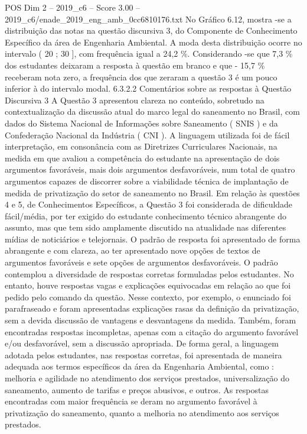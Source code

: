 \begin{textsample}{POS Dim 2 – 2019\_c6 – Score 3.00 – 2019\_c6/enade\_2019\_eng\_amb\_0cc6810176.txt}
No Gráfico 6.12, mostra -se a distribuição das notas na questão discursiva 3, do Componente de Conhecimento Específico da área de Engenharia Ambiental.
A moda desta distribuição ocorre no intervalo ( 20 ; 30 ], com frequência igual a 24,2 \%.
Considerando -se que 7,3 \% dos estudantes deixaram a resposta à questão em branco e que - 15,7 \% receberam nota zero, a frequência dos que zeraram a questão 3 é um pouco inferior à do intervalo modal. 6.3.2.2 Comentários sobre as respostas à Questão Discursiva 3 A Questão 3 apresentou clareza no conteúdo, sobretudo na contextualização da discussão atual do marco legal do saneamento no Brasil, com dados do Sistema Nacional de Informações sobre Saneamento ( SNIS ) e da Confederação Nacional da Indústria ( CNI ).
A linguagem utilizada foi de fácil interpretação, em consonância com as Diretrizes Curriculares Nacionais, na medida em que avaliou a competência do estudante na apresentação de dois argumentos favoráveis, mais dois argumentos desfavoráveis, num total de quatro argumentos capazes de discorrer sobre a viabilidade técnica de implantação de medida de privatização do setor de saneamento no Brasil.
Em relação às questões 4 e 5, de Conhecimentos Específicos, a Questão 3 foi considerada de dificuldade fácil/média, por ter exigido do estudante conhecimento técnico abrangente do assunto, mas que tem sido amplamente discutido na atualidade nas diferentes mídias de noticiários e telejornais.
O padrão de resposta foi apresentado de forma abrangente e com clareza, ao ter apresentado nove opções de textos de argumentos favoráveis e sete opções de argumentos desfavoráveis.
O padrão contemplou a diversidade de respostas corretas formuladas pelos estudantes.
No entanto, houve respostas vagas e explicações equivocadas em relação ao que foi pedido pelo comando da questão.
Nesse contexto, por exemplo, o enunciado foi parafraseado e foram apresentadas explicações rasas da definição da privatização, sem a devida discussão de vantagens e desvantagens da medida.
Também, foram encontradas respostas incompletas, apenas com a citação do argumento favorável e/ou desfavorável, sem a discussão apropriada.
De forma geral, a linguagem adotada pelos estudantes, nas respostas corretas, foi apresentada de maneira adequada aos termos específicos da área da Engenharia Ambiental, como : melhoria e agilidade no atendimento dos serviços prestados, universalização do saneamento, aumento de tarifas e preços abusivos, e outros.
As respostas encontradas com maior frequência se deram no argumento favorável à privatização do saneamento, quanto a melhoria no atendimento aos serviços prestados.

\end{textsample}
